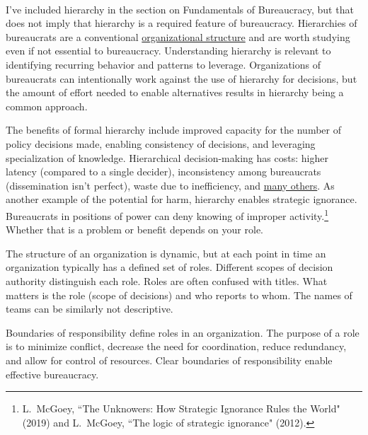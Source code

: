 \ \\

I've included hierarchy in the section on Fundamentals of Bureaucracy, but that does not imply that hierarchy is a required feature of bureaucracy. Hierarchies of bureaucrats are a conventional \href{https://en.wikipedia.org/wiki/Organizational_structure}{organizational structure} 
\iftoggle{WPinmargin}{\marginpar{$>$Wikipedia: Organizational structure}}{}
and are worth studying even if not essential to bureaucracy. Understanding hierarchy is relevant to identifying recurring behavior and patterns to leverage.
Organizations of bureaucrats can intentionally work against the use of hierarchy for decisions, but the amount of effort needed to enable alternatives results in hierarchy being a common approach.

The benefits of formal hierarchy include improved capacity for the number of policy decisions made, enabling consistency of decisions, and leveraging specialization of knowledge. 
Hierarchical decision-making has costs: higher latency (compared to a single decider), inconsistency among bureaucrats (dissemination isn't perfect), waste due to inefficiency, and 
\hyperref[sec:unavoidable-hazards]{many others}.
As another example of the potential for harm, hierarchy enables strategic ignorance. Bureaucrats in positions of power can deny knowing of improper activity.\footnote{L.~McGoey, ``The Unknowers: How Strategic Ignorance Rules the World" (2019)
and 
L.~McGoey, ``The logic of strategic ignorance" (2012). 
} Whether that is a problem or benefit depends on your role. 



The structure of an organization is dynamic, but at each point in time an organization typically has a defined set of roles. Different scopes of decision authority distinguish each role. 
Roles are often confused with titles. What matters is the role (scope of decisions) and who reports to whom. The names of teams can be similarly not descriptive.




Boundaries of responsibility define roles in an organization. The purpose of a role is to minimize conflict, decrease the need for coordination, reduce redundancy, and allow for control of resources. Clear boundaries of responsibility  enable effective bureaucracy. 


